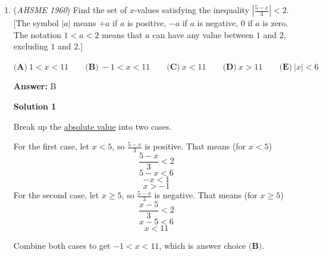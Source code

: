 \begin{enumerate}
\textbf{Solution}

First, factor the \href{https://artofproblemsolving.com/wiki/index.php?title=Difference\_of\_squares}{difference of squares}.
 \[(m+n)(m-n)\]Since $m$ and $n$ are odd numbers, let $m=2a+1$ and $n=2b+1$, where $a$ and $b$ can be any integer.
 \[(2a+2b+2)(2a-2b)\]Factor the resulting expression.
 \[4(a+b+1)(a-b)\]If $a$ and $b$ are both even, then $a-b$ is even.  If $a$ and $b$ are both odd, then $a-b$ is even as well.  If $a$ is odd and $b$ is even (or vise versa), then $a+b+1$ is even.  Therefore, in all cases, $8$ can be divided into all numbers with the form $m^2-n^2$.

 This can be confirmed by setting $m=3$ and $n=1$, making $m^2-n^2=9-1=8$.  Since $8$ is not a multiple of $3$ and is less than $16$, we can confirm that the answer is $\boxed{\textbf{(D)}}$.

 \textbf{solution 2(logic)} we can factorize it into 
 \[(m+n)(m-n)\] the we knows both of them are even and if we have 2 consecutive even number atlesast one of the me is divisible by 4 so our answer is 4*2 =8

 


	\item (\textit{AHSME 1960}) Find the set of $x$-values satisfying the inequality $\left|\frac{5-x}{3}\right| < 2$. [The symbol $|a|$ means $+a$ if $a$ is positive, 
$-a$ if $a$ is negative, $0$ if $a$ is zero. The notation $1 < a < 2$ means that $a$ can have any value between $1$ and $2$, excluding $1$ and $2$.]


 $\textbf{(A)}\ 1 < x < 11\qquad \textbf{(B)}\ -1 < x < 11\qquad \textbf{(C)}\ x < 11\qquad \textbf{(D)}\ x > 11\qquad \textbf{(E)}\ |x| < 6$

 \textbf{Answer: }B



\textbf{Solution 1}

Break up the \href{https://artofproblemsolving.com/wiki/index.php?title=Absolute\_value}{absolute value} into two cases.

 For the first case, let $x < 5$, so $\frac{5-x}{3}$ is positive.  That means (for $x<5$)
 \[\frac{5-x}{3} < 2\]
 \[5-x<6\]
 \[-x<1\]
 \[x>-1\]For the second case, let $x \ge 5$, so $\frac{5-x}{3}$ is negative.  That means (for $x \ge 5$)
 \[\frac{x-5}{3} < 2\]
 \[x-5<6\]
 \[x<11\]

 Combine both cases to get $-1 < x < 11$, which is answer choice $\boxed{\textbf{(B)}}$.

 




\end{enumerate}
